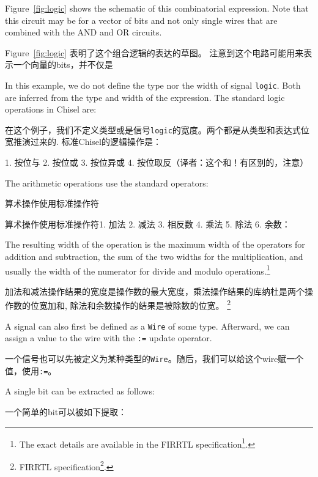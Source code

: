 \documentclass[%
    10pt,
    headinclude, footexclude,
    openright, %
    notitlepage,
    cleardoubleempty,
    headsepline,
    pointlessnumbers,
    bibtotoc, idxtotoc,
    ]{scrbook}
\newcommand{\code}[1]{{\small{\texttt{#1}}}}
\newcommand{\myref}[2]{\href{#1}{#2}}
\renewcommand{\myref}[2]{{#2}{\footnote{\url{#1}}}}
\begin{document}
Figure~\ref{fig:logic} shows the schematic of this combinatorial expression.
Note that this circuit may be for a vector of bits and not only single wires
that are combined with the AND and OR circuits.

Figure~\ref{fig:logic} 表明了这个组合逻辑的表达的草图。
注意到这个电路可能用来表示一个向量的bits，并不仅是

In this example, we do not define the type nor the width of signal \code{logic}.
Both are inferred from the type and width of the expression.
The standard logic operations in Chisel are:

在这个例子，我们不定义类型或是信号\code{logic}的宽度。两个都是从类型和表达式位宽推演过来的.
标准Chisel的逻辑操作是：



1. 按位与
2. 按位或
3. 按位异或
4. 按位取反（译者：这个和！有区别的，注意）

\noindent The arithmetic operations use the standard operators:

\noindent 算术操作使用标准操作符


算术操作使用标准操作符1. 加法 2. 减法 3. 相反数 4. 乘法 5. 除法 6. 余数：

\noindent The resulting width of the operation is the maximum width of the operators for
addition and subtraction, the sum of the two widths for the multiplication, and usually
the width of the numerator for divide and modulo operations.\footnote{The exact
details are available in the \myref{https://github.com/freechipsproject/firrtl/blob/master/spec/spec.pdf}{FIRRTL specification}.}

加法和减法操作结果的宽度是操作数的最大宽度，乘法操作结果的库纳杜是两个操作数的位宽加和, 除法和余数操作的结果是被除数的位宽。
\footnote{ \myref{https://github.com/freechipsproject/firrtl/blob/master/spec/spec.pdf}{FIRRTL specification}.}

A signal can also first be defined as a \code{Wire} of some type. Afterward, we can assign a
value to the wire with the \code{:=} update operator.

一个信号也可以先被定义为某种类型的\code{Wire}。随后，我们可以给这个wire赋一个值，使用\code{:=}。


A single bit can be extracted as follows:

一个简单的bit可以被如下提取：

\end{document}
